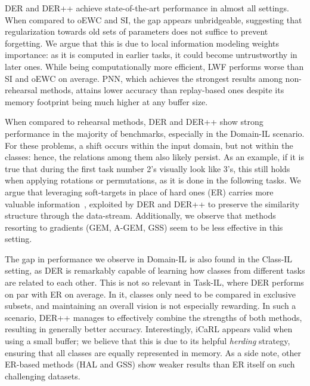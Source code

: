 \documentclass{article}
\begin{document}
DER and DER++ achieve state-of-the-art performance in almost all settings. When compared to oEWC and SI, the gap appears unbridgeable, suggesting that regularization towards old sets of parameters does not suffice to prevent forgetting. We argue that this is due to local information modeling weights importance: as it is computed in earlier tasks, it could become untrustworthy in later ones. While being computationally more efficient, LWF performs worse than SI and oEWC on average. PNN, which achieves the strongest results among non-rehearsal methods, attains lower accuracy than replay-based ones despite its memory footprint being much higher at any buffer size.

When compared to rehearsal methods, DER and DER++ show strong performance in the majority of benchmarks, especially in the Domain-IL scenario. For these problems, a shift occurs within the input domain, but not within the classes: hence, the relations among them also likely persist. As an example, if it is true that during the first task number 2's visually look like 3's, this still holds when applying rotations or permutations, as it is done in the following tasks. We argue that leveraging soft-targets in place of hard ones (ER) carries more valuable information~\cite{hinton2015distilling}, exploited by DER and DER++ to preserve the similarity structure through the data-stream. Additionally, we observe that methods resorting to gradients (GEM, A-GEM, GSS) seem to be less effective in this setting.

The gap in performance we observe in Domain-IL is also found in the Class-IL setting, as DER is remarkably capable of learning how classes from different tasks are related to each other. This is not so relevant in Task-IL, where DER performs on par with ER on average. In it, classes only need to be compared in exclusive subsets, and maintaining an overall vision is not especially rewarding. In such a scenario, DER++ manages to effectively combine the strengths of both methods, resulting in generally better accuracy. Interestingly, iCaRL appears valid when using a small buffer; we believe that this is due to its helpful \textit{herding} strategy, ensuring that all classes are equally represented in memory. As a side note, other ER-based methods (HAL and GSS) show weaker results than ER itself on such challenging datasets.
\end{document}
